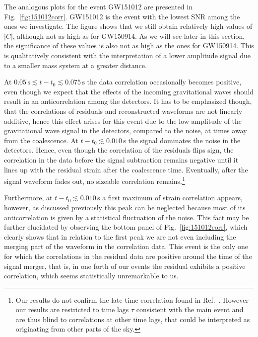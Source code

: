 \documentclass[a4paper,11pt]{article}
\begin{document}
The analogous plots for the event GW151012 are presented in Fig.~\ref{fig:151012corr}. GW151012 is the event with the lowest SNR among the ones we investigate. The figure shows that we still obtain relatively high values of $|C|$, although not as high as for GW150914. As we will see later in this section, the significance of these values is also not as high as the ones for GW150914. This is qualitatively consistent with the interpretation of a lower amplitude signal due to a smaller mass system at a greater distance.

At $0.05\,\textrm{s} \lesssim t-t_0 \lesssim 0.075\,\textrm{s}$ the data correlation occasionally becomes positive, even though we expect that the effects of the incoming gravitational waves should result in an anticorrelation among the detectors. It has to be emphasized though, that the correlations of residuals and reconstructed waveforms are not linearly additive, hence this effect arises for this event due to the low amplitude of the gravitational wave signal in the detectors, compared to the noise, at times away from the coalescence. At $t-t_0 \lesssim 0.010\,\textrm{s}$  the signal dominates the noise in the detectors. Hence, even though the correlation of the residuals flips sign, the correlation in the data before the signal subtraction remains negative until it lines up with the residual strain after the coalescence time. Eventually, after the signal waveform fades out, no sizeable correlation remains.\footnote{Our results do not confirm the late-time correlation found in Ref.~\cite{Salemi:2019uea}. However our results are restricted to time lags $\tau$ consistent with the main event and are thus blind to correlations at other time lags, that could be interpreted as originating from other parts of the sky.} 

Furthermore, at $t-t_0 \lesssim 0.010\,\textrm{s}$ a first maximum of strain correlation appears, however, as discussed previously this peak can be neglected because most of its anticorrelation is given by a statistical fluctuation of the noise. This fact may be further elucidated by observing the bottom panel of Fig.~\ref{fig:151012corr}, which clearly shows that in relation to the first peak we are not even including the merging part of the waveform in the correlation data. This event is the only one for which the correlations in the residual data are positive around the time of the signal merger, that is, in one forth of our events the residual exhibits a positive correlation, which seems statistically unremarkable to us.  
\end{document}
